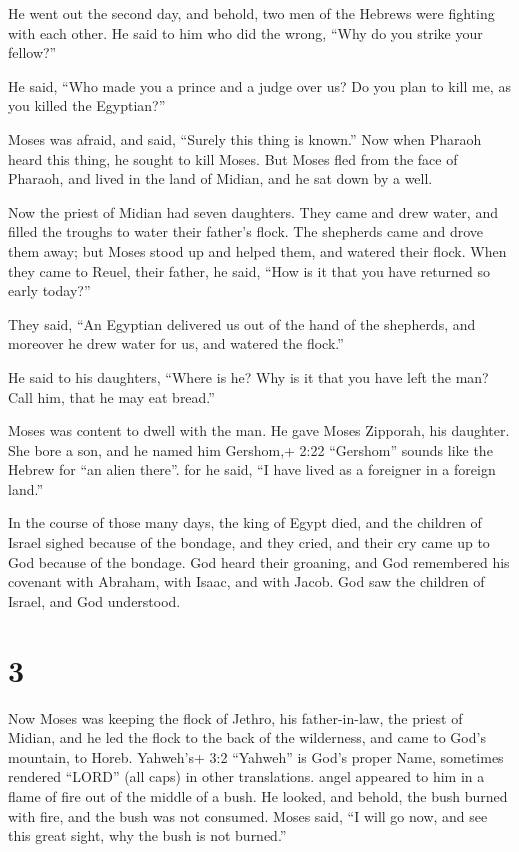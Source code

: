  He went out the second day, and behold, two men of the
Hebrews were fighting with each other. He said to him who did the wrong,
``Why do you strike your fellow?''

 He said, ``Who made you a prince and a judge over us? Do
you plan to kill me, as you killed the Egyptian?''

Moses was afraid, and said, ``Surely this thing is known.''
 Now when Pharaoh heard this thing, he sought to kill
Moses. But Moses fled from the face of Pharaoh, and lived in the land of
Midian, and he sat down by a well.

 Now the priest of Midian had seven daughters. They came
and drew water, and filled the troughs to water their father's flock.
 The shepherds came and drove them away; but Moses stood up
and helped them, and watered their flock.  When they came
to Reuel, their father, he said, ``How is it that you have returned so
early today?''

 They said, ``An Egyptian delivered us out of the hand of
the shepherds, and moreover he drew water for us, and watered the
flock.''

 He said to his daughters, ``Where is he? Why is it that
you have left the man? Call him, that he may eat bread.''

 Moses was content to dwell with the man. He gave Moses
Zipporah, his daughter.  She bore a son, and he named him
Gershom,+ 2:22 ``Gershom'' sounds like the Hebrew for ``an alien
there''. for he said, ``I have lived as a foreigner in a foreign land.''

 In the course of those many days, the king of Egypt died,
and the children of Israel sighed because of the bondage, and they
cried, and their cry came up to God because of the bondage.
 God heard their groaning, and God remembered his covenant
with Abraham, with Isaac, and with Jacob.  God saw the
children of Israel, and God understood.

\hypertarget{section-2}{%
\section{3}\label{section-2}}

 Now Moses was keeping the flock of Jethro, his
father-in-law, the priest of Midian, and he led the flock to the back of
the wilderness, and came to God's mountain, to Horeb. 
Yahweh's+ 3:2 ``Yahweh'' is God's proper Name, sometimes rendered
``LORD'' (all caps) in other translations. angel appeared to him in a
flame of fire out of the middle of a bush. He looked, and behold, the
bush burned with fire, and the bush was not consumed.  Moses
said, ``I will go now, and see this great sight, why the bush is not
burned.''

